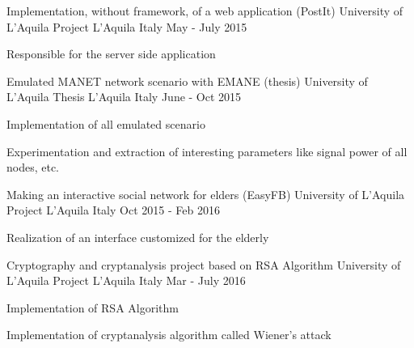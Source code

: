 


\begin{cventries}


\cventry
{Implementation, without framework, of a web application (PostIt)} %
{University of L'Aquila Project} %
{L'Aquila Italy} %
{May - July 2015} %
{ %
	\begin{cvitems}
		\item {Responsible for the server side application}
	\end{cvitems}
}

\cventry
{Emulated MANET network scenario with EMANE (thesis) } %
{University of L'Aquila Thesis} %
{L'Aquila Italy} %
{June - Oct 2015} %
{ %
	\begin{cvitems}
		\item {Implementation of all emulated scenario}
		\item {Experimentation and extraction of interesting parameters like signal power of all nodes, etc.}
	\end{cvitems}
}

\cventry
{Making an interactive social network for elders (EasyFB)} %
{University of L'Aquila Project} %
{L'Aquila Italy} %
{Oct 2015 - Feb 2016} %
{ %
	\begin{cvitems}
		\item {Realization of an interface customized for the elderly}
	\end{cvitems}
}

\cventry
{Cryptography and cryptanalysis project based on RSA Algorithm} %
{University of L'Aquila Project} %
{L'Aquila Italy} %
{Mar - July 2016} %
{
	\begin{cvitems}
		\item {Implementation of RSA Algorithm}
		\item {Implementation of cryptanalysis algorithm called Wiener's attack}
	\end{cvitems}
}


\end{cventries}
